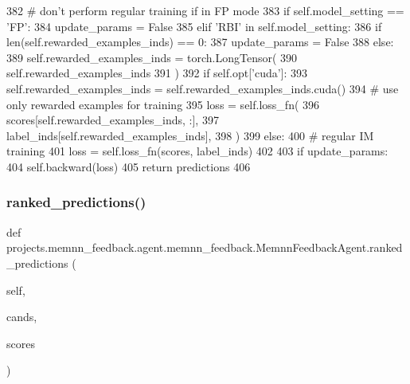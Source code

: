 \begin{DoxyCode}
382             \textcolor{comment}{# don't perform regular training if in FP mode}
383             \textcolor{keywordflow}{if} self.model\_setting == \textcolor{stringliteral}{'FP'}:
384                 update\_params = \textcolor{keyword}{False}
385             \textcolor{keywordflow}{elif} \textcolor{stringliteral}{'RBI'} \textcolor{keywordflow}{in} self.model\_setting:
386                 \textcolor{keywordflow}{if} len(self.rewarded\_examples\_inds) == 0:
387                     update\_params = \textcolor{keyword}{False}
388                 \textcolor{keywordflow}{else}:
389                     self.rewarded\_examples\_inds = torch.LongTensor(
390                         self.rewarded\_examples\_inds
391                     )
392                     \textcolor{keywordflow}{if} self.opt[\textcolor{stringliteral}{'cuda'}]:
393                         self.rewarded\_examples\_inds = self.rewarded\_examples\_inds.cuda()
394                     \textcolor{comment}{# use only rewarded examples for training}
395                     loss = self.loss\_fn(
396                         scores[self.rewarded\_examples\_inds, :],
397                         label\_inds[self.rewarded\_examples\_inds],
398                     )
399             \textcolor{keywordflow}{else}:
400                 \textcolor{comment}{# regular IM training}
401                 loss = self.loss\_fn(scores, label\_inds)
402 
403             \textcolor{keywordflow}{if} update\_params:
404                 self.backward(loss)
405         \textcolor{keywordflow}{return} predictions
406 
\end{DoxyCode}
\mbox{\label{classprojects_1_1memnn__feedback_1_1agent_1_1memnn__feedback_1_1MemnnFeedbackAgent_a1f4d9fba4c0ebf00025f328421a9af55}} 
\subsubsection{\texorpdfstring{ranked\+\_\+predictions()}{ranked\_predictions()}}
{\footnotesize\ttfamily def projects.\+memnn\+\_\+feedback.\+agent.\+memnn\+\_\+feedback.\+Memnn\+Feedback\+Agent.\+ranked\+\_\+predictions (\begin{DoxyParamCaption}\item[{}]{self,  }\item[{}]{cands,  }\item[{}]{scores }\end{DoxyParamCaption})}



